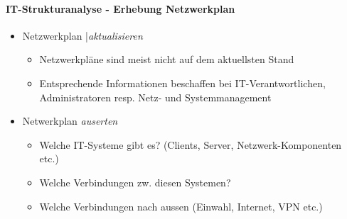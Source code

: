 \documentclass[10pt,a4paper]{article}
\begin{document}
\paragraph*{IT-Strukturanalyse - Erhebung Netzwerkplan}
\begin{itemize}[noitemsep,topsep=0pt,leftmargin=*]
    \item Netzwerkplan |\textsl{aktualisieren}
    \begin{itemize}[noitemsep,topsep=0pt,leftmargin=*]
        \item Netzwerkpläne sind meist nicht auf dem aktuellsten Stand
        \item Entsprechende Informationen beschaffen bei IT-Verantwortlichen, Administratoren resp. Netz- und Systemmanagement
    \end{itemize}
    \item Netwerkplan \textsl{auserten}
    \begin{itemize}[noitemsep,topsep=0pt,leftmargin=*]
        \item  Welche IT-Systeme gibt es? (Clients, Server, Netzwerk-Komponenten etc.)
        \item Welche Verbindungen zw. diesen Systemen?
        \item Welche Verbindungen nach aussen (Einwahl, Internet, VPN etc.)
    \end{itemize}
\end{itemize}
\end{document}
